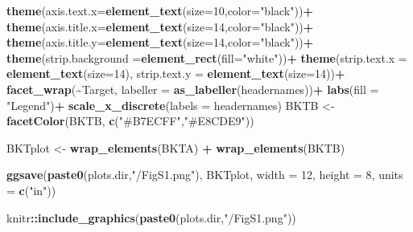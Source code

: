 \documentclass[
]{article}
\newenvironment{Shaded}{\begin{snugshade}}{\end{snugshade}}
\newcommand{\AttributeTok}[1]{\textcolor[rgb]{0.13,0.29,0.53}{#1}}
\newcommand{\DecValTok}[1]{\textcolor[rgb]{0.00,0.00,0.81}{#1}}
\newcommand{\FunctionTok}[1]{\textcolor[rgb]{0.13,0.29,0.53}{\textbf{#1}}}
\newcommand{\NormalTok}[1]{#1}
\newcommand{\OtherTok}[1]{\textcolor[rgb]{0.56,0.35,0.01}{#1}}
\newcommand{\SpecialCharTok}[1]{\textcolor[rgb]{0.81,0.36,0.00}{\textbf{#1}}}
\newcommand{\StringTok}[1]{\textcolor[rgb]{0.31,0.60,0.02}{#1}}
\begin{document}
\begin{Shaded}
\begin{Highlighting}[]
  \FunctionTok{theme}\NormalTok{(}\AttributeTok{axis.text.x=}\FunctionTok{element\_text}\NormalTok{(}\AttributeTok{size=}\DecValTok{10}\NormalTok{,}\AttributeTok{color=}\StringTok{"black"}\NormalTok{))}\SpecialCharTok{+}
  \FunctionTok{theme}\NormalTok{(}\AttributeTok{axis.title.x=}\FunctionTok{element\_text}\NormalTok{(}\AttributeTok{size=}\DecValTok{14}\NormalTok{,}\AttributeTok{color=}\StringTok{"black"}\NormalTok{))}\SpecialCharTok{+}
  \FunctionTok{theme}\NormalTok{(}\AttributeTok{axis.title.y=}\FunctionTok{element\_text}\NormalTok{(}\AttributeTok{size=}\DecValTok{14}\NormalTok{,}\AttributeTok{color=}\StringTok{"black"}\NormalTok{))}\SpecialCharTok{+}
  \FunctionTok{theme}\NormalTok{(}\AttributeTok{strip.background =}\FunctionTok{element\_rect}\NormalTok{(}\AttributeTok{fill=}\StringTok{"white"}\NormalTok{))}\SpecialCharTok{+}
  \FunctionTok{theme}\NormalTok{(}\AttributeTok{strip.text.x =} \FunctionTok{element\_text}\NormalTok{(}\AttributeTok{size=}\DecValTok{14}\NormalTok{),}
        \AttributeTok{strip.text.y =} \FunctionTok{element\_text}\NormalTok{(}\AttributeTok{size=}\DecValTok{14}\NormalTok{))}\SpecialCharTok{+}
  \FunctionTok{facet\_wrap}\NormalTok{(}\SpecialCharTok{\textasciitilde{}}\NormalTok{Target, }\AttributeTok{labeller =} \FunctionTok{as\_labeller}\NormalTok{(headernames))}\SpecialCharTok{+}
  \FunctionTok{labs}\NormalTok{(}\AttributeTok{fill =} \StringTok{"Legend"}\NormalTok{)}\SpecialCharTok{+}
  \FunctionTok{scale\_x\_discrete}\NormalTok{(}\AttributeTok{labels =}\NormalTok{ headernames)}
\NormalTok{BKTB }\OtherTok{\textless{}{-}} \FunctionTok{facetColor}\NormalTok{(BKTB, }\FunctionTok{c}\NormalTok{(}\StringTok{"\#B7ECFF"}\NormalTok{,}\StringTok{"\#E8CDE9"}\NormalTok{))}

\NormalTok{BKTplot }\OtherTok{\textless{}{-}} \FunctionTok{wrap\_elements}\NormalTok{(BKTA) }\SpecialCharTok{+} \FunctionTok{wrap\_elements}\NormalTok{(BKTB)}

\FunctionTok{ggsave}\NormalTok{(}\FunctionTok{paste0}\NormalTok{(plots.dir,}\StringTok{"/FigS1.png"}\NormalTok{), BKTplot, }\AttributeTok{width =} \DecValTok{12}\NormalTok{, }\AttributeTok{height =} \DecValTok{8}\NormalTok{, }\AttributeTok{units =} \FunctionTok{c}\NormalTok{(}\StringTok{"in"}\NormalTok{))}

\NormalTok{knitr}\SpecialCharTok{::}\FunctionTok{include\_graphics}\NormalTok{(}\FunctionTok{paste0}\NormalTok{(plots.dir,}\StringTok{"/FigS1.png"}\NormalTok{))}
\end{Highlighting}
\end{Shaded}
\end{document}
